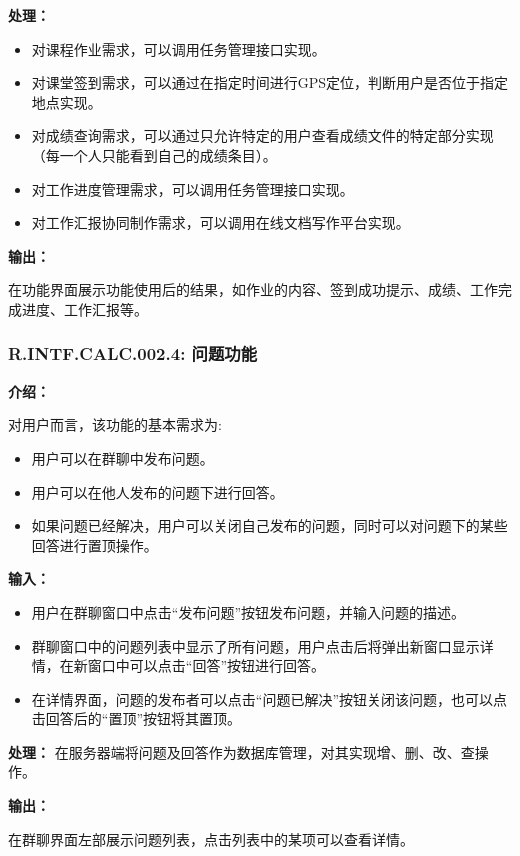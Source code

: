 \textbf{处理：}

\begin{itemize}
    \item 对课程作业需求，可以调用任务管理接口实现。
    \item 对课堂签到需求，可以通过在指定时间进行GPS定位，判断用户是否位于指定地点实现。
    \item 对成绩查询需求，可以通过只允许特定的用户查看成绩文件的特定部分实现（每一个人只能看到自己的成绩条目）。
    \item 对工作进度管理需求，可以调用任务管理接口实现。
    \item 对工作汇报协同制作需求，可以调用在线文档写作平台实现。
\end{itemize}

\textbf{输出：}

在功能界面展示功能使用后的结果，如作业的内容、签到成功提示、成绩、工作完成进度、工作汇报等。


{\color{red}
\subsubsection{R.INTF.CALC.002.4: 问题功能}
\textbf{介绍：}

对用户而言，该功能的基本需求为:
\begin{itemize}
  \item 用户可以在群聊中发布问题。
  \item 用户可以在他人发布的问题下进行回答。
  \item 如果问题已经解决，用户可以关闭自己发布的问题，同时可以对问题下的某些回答进行置顶操作。
\end{itemize}

\textbf{输入：}

\begin{itemize}
  \item 用户在群聊窗口中点击“发布问题”按钮发布问题，并输入问题的描述。
  \item 群聊窗口中的问题列表中显示了所有问题，用户点击后将弹出新窗口显示详情，在新窗口中可以点击“回答”按钮进行回答。
  \item 在详情界面，问题的发布者可以点击“问题已解决”按钮关闭该问题，也可以点击回答后的“置顶”按钮将其置顶。
\end{itemize}

\textbf{处理：}
在服务器端将问题及回答作为数据库管理，对其实现增、删、改、查操作。

\textbf{输出：}

在群聊界面左部展示问题列表，点击列表中的某项可以查看详情。

}






